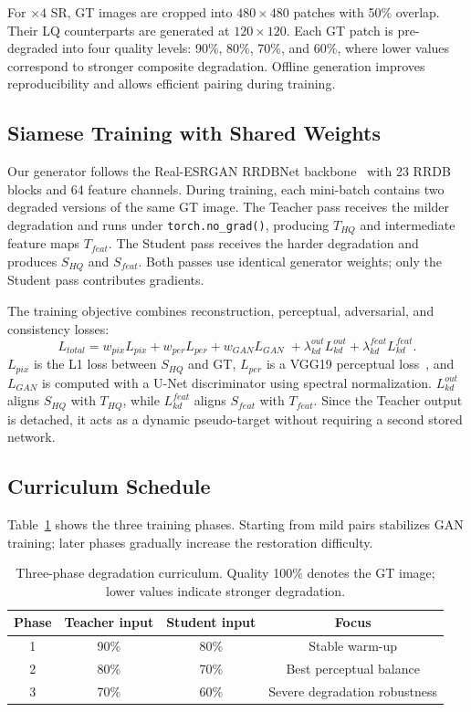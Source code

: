 \documentclass[runningheads]{llncs}
\begin{document}
For $\times4$ SR, GT images are cropped into $480\times480$ patches with 50\% overlap. Their LQ counterparts are generated at $120\times120$. Each GT patch is pre-degraded into four quality levels: 90\%, 80\%, 70\%, and 60\%, where lower values correspond to stronger composite degradation. Offline generation improves reproducibility and allows efficient pairing during training.

\subsection{Siamese Training with Shared Weights}

Our generator follows the Real-ESRGAN RRDBNet backbone~\cite{wang2018esrgan,wang2021realesrgan} with 23 RRDB blocks and 64 feature channels. During training, each mini-batch contains two degraded versions of the same GT image. The Teacher pass receives the milder degradation and runs under \texttt{torch.no\_grad()}, producing $T_{HQ}$ and intermediate feature maps $T_{feat}$. The Student pass receives the harder degradation and produces $S_{HQ}$ and $S_{feat}$. Both passes use identical generator weights; only the Student pass contributes gradients.

The training objective combines reconstruction, perceptual, adversarial, and consistency losses:
\[
L_{total}=w_{pix}L_{pix}+w_{per}L_{per}+w_{GAN}L_{GAN}
\;+\lambda^{out}_{kd}L^{out}_{kd}+\lambda^{feat}_{kd}L^{feat}_{kd}.
\]
$L_{pix}$ is the L1 loss between $S_{HQ}$ and GT, $L_{per}$ is a VGG19 perceptual loss~\cite{simonyan2014very,johnson2016perceptual}, and $L_{GAN}$ is computed with a U-Net discriminator using spectral normalization. $L^{out}_{kd}$ aligns $S_{HQ}$ with $T_{HQ}$, while $L^{feat}_{kd}$ aligns $S_{feat}$ with $T_{feat}$. Since the Teacher output is detached, it acts as a dynamic pseudo-target without requiring a second stored network.

\subsection{Curriculum Schedule}

Table~\ref{tab:curriculum} shows the three training phases. Starting from mild pairs stabilizes GAN training; later phases gradually increase the restoration difficulty.

\begin{table}[t]
\centering
\caption{Three-phase degradation curriculum. Quality 100\% denotes the GT image; lower values indicate stronger degradation.}
\label{tab:curriculum}
\small
\begin{tabular}{@{}cccc@{}}
\toprule
\textbf{Phase} & \textbf{Teacher input} & \textbf{Student input} & \textbf{Focus} \\
\midrule
1 & 90\% & 80\% & Stable warm-up \\
2 & 80\% & 70\% & Best perceptual balance \\
3 & 70\% & 60\% & Severe degradation robustness \\
\bottomrule
\end{tabular}
\end{table}
\end{document}
